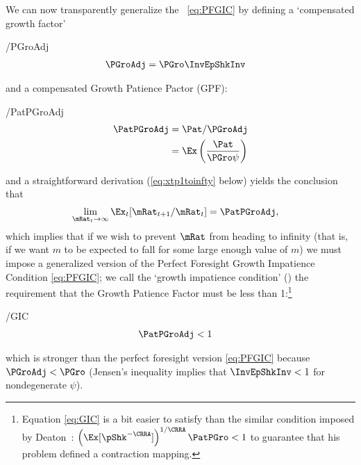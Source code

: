 \documentclass[BufferStockTheory]{subfiles}
\begin{document}
\hypertarget{GIC}{}
\hypertarget{GICI}{}
We can now transparently generalize the \PFGIC~\eqref{eq:PFGIC} by defining a `compensated growth factor' \hypertarget{PGroAdj}{}
\begin{verbatimwrite}{\EqDir/PGroAdj}
  \begin{align}
    \PGroAdj  & =  \PGro \InvEpShkInv \label{eq:PGroAdj}
  \end{align}
\end{verbatimwrite}

and a compensated Growth Patience Pactor (GPF):\hypertarget{GIF}{}
\begin{verbatimwrite}{\EqDir/PatPGroAdj}
  \begin{align}
    \PatPGroAdj  & = \Pat/\PGroAdj \label{eq;GPF}
    \\ & = \Ex\left(\frac{\Pat}{\PGro \psi}\right) \notag
  \end{align}
\end{verbatimwrite}

and a straightforward derivation (\eqref{eq:xtp1toinfty} below) yields the conclusion that
\begin{align*}
  \lim_{\mRat_{t} \rightarrow \infty} \Ex_{t}[\mRat_{t+1}/\mRat_{t}]  & = \PatPGroAdj,
\end{align*}
which implies that if we wish to prevent $\mRat$ from heading to infinity (that is, if we want $m$ to be expected to fall for some large enough value of $m$) we must impose a generalized version of the Perfect Foresight Growth Impatience Condition \eqref{eq:PFGIC}; we call the `growth impatience condition' (\GIC) the requirement that the Growth Patience Factor must be less than 1:\footnote{Equation \eqref{eq:GIC} is a bit easier to satisfy than the similar condition imposed by Deaton~\citeyearpar{deatonLiqConstr}: $\left(\Ex[\pShk^{-\CRRA}]\right)^{1/\CRRA} \PatPGro < 1$ to guarantee that his problem defined a contraction mapping.}  
\begin{verbatimwrite}{\EqDir/GIC}
  \begin{align}
    \PatPGroAdj  & < 1 \label{eq:GIC}
  \end{align}\end{verbatimwrite}

which is stronger than the perfect foresight version \eqref{eq:PFGIC} because $\PGroAdj < \PGro$ (Jensen's inequality implies that $\InvEpShkInv < 1$ for nondegenerate $\psi$).

\hypertarget{Autarky-Value}{}
\end{document}
